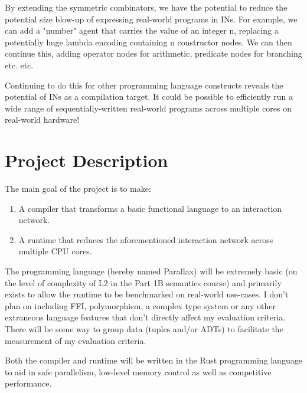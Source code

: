 \documentclass{article}
\newcommand{\Name}{Parallax}
\begin{document}
By extending the symmetric combinators, we have the potential to reduce the potential size blow-up of expressing real-world programs in INs. For example, we can add a "number" agent that carries the value of an integer n, replacing a potentially huge lambda encoding containing n constructor nodes. We can then continue this, adding operator nodes for arithmetic, predicate nodes for branching etc. etc.

Continuing to do this for other programming language constructs reveals the potential of INs as a compilation target. It could be possible to efficiently run a wide range of sequentially-written real-world programs across multiple cores on real-world hardware!


\section{Project Description}
The main goal of the project is to make:
\begin{enumerate}
    \item A compiler that transforms a basic functional language to an interaction network.
    \item A runtime that reduces the aforementioned interaction network across multiple CPU cores.
\end{enumerate}

The programming language (hereby named \Name) will be extremely basic (on the level of complexity of L2 in the Part 1B semantics course) and primarily exists to allow the runtime to be benchmarked on real-world use-cases. I don't plan on including FFI, polymorphism, a complex type system or any other extraneous language features that don't directly affect my evaluation criteria. There will be some way to group data (tuples and/or ADTs) to facilitate the measurement of my evaluation criteria.

Both the compiler and runtime will be written in the Rust programming language to aid in safe parallelism, low-level memory control as well as competitive performance.
\end{document}
